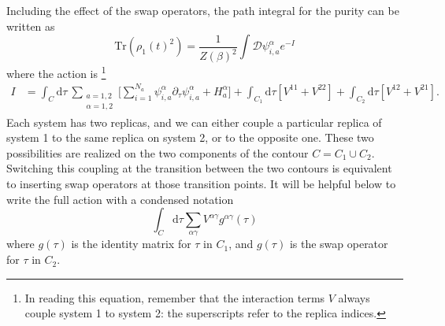 \documentclass[12pt]{article}
\newcommand{\be}{\begin{equation}}
\newcommand{\ee}{\end{equation}}
\numberwithin{equation}{section}
\def\tr{\text{Tr}}
\begin{document}
Including the effect of the swap operators, the path integral for the purity can be written as 
\be
\tr\left(\rho_1(t)^2\right)= \frac{1}{Z(\beta)^2}\int \mathcal{D}\psi_{i,a}^\alpha e^{-I}\label{toAVG}
\ee
where the action is \cite{Gu:2017njx}\footnote{In reading this equation, remember that the interaction terms $V$ always couple system 1 to system 2: the superscripts refer to the replica indices.}
\begin{align}
I &= \int_C \mathrm{d}\tau \ \sum_{\substack{a = 1,2 \\ \alpha = 1,2}}\Bigg[\sum_{i = 1}^{N_a}\psi_{i,a}^\alpha \partial_\tau \psi_{i,a}^\alpha + H_{a}^\alpha \Bigg]+ \int_{C_1}\mathrm{d}\tau \left[V^{11} + V^{22}\right] + \int_{C_2}\mathrm{d}\tau \left[V^{12} + V^{21} \right].
\end{align}
Each system has two replicas, and we can either couple a particular replica of system 1 to the same replica on system 2, or to the opposite one. These two possibilities are realized on the two components of the contour $C = C_1 \cup C_2$. Switching this coupling at the transition between the two contours is equivalent to inserting swap operators at those transition points. It will be helpful below to write the full action with a condensed notation
\be
\int_C \mathrm{d}\tau \sum_{\alpha\gamma}V^{\alpha\gamma}g^{\alpha\gamma}(\tau)
\ee
where $g(\tau)$ is the identity matrix for $\tau$ in $C_1$, and $g(\tau)$ is the swap operator for $\tau$ in $C_2$.
\end{document}
